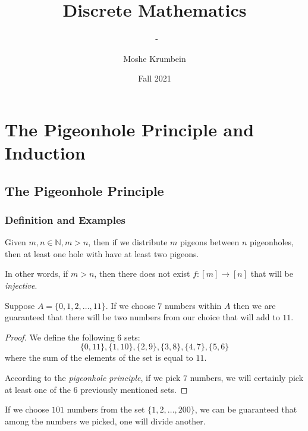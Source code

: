 \documentclass[00_complete]{subfiles}
\title{Discrete Mathematics}
\author{Moshe Krumbein}
\date{Fall 2021}
\begin{document}
\setcounter{chapter}{7}

\chapter{The Pigeonhole Principle and Induction}
\subtitle{\theauthor~- \thedate}

\section{The Pigeonhole Principle}
\subsection{Definition and Examples}
\begin{definition}
    Given $m, n \in \mathbb{N}, m>n$, then if we distribute $m$ pigeons between
    $n$ pigeonholes, then at least one hole with have at least two pigeons.

    In other words, if $m>n$, then there does not exist $f: [m] \to [n]$ that
    will be \emph{injective}.
\end{definition}

\begin{claim}
    Suppose $A =\{0,1,2,\dots,11\}$. If we choose $7$ numbers within $A$ then
    we are guaranteed that there will be two numbers from our choice that will
    add to $11$.
\end{claim}

\begin{proof}
    We define the following $6$ sets:
    $$\{0,11\},\{1,10\}, \{2,9\}, \{3,8\}, \{4,7\}, \{5,6\}$$
    where the sum of the elements of the set is equal to $11$.

    According to the \emph{pigeonhole principle}, if we pick $7$ numbers, we
    will certainly pick at least one of the $6$ previously mentioned sets.
\end{proof}

\begin{claim}
    If we choose $101$ numbers from the set $\{1,2,\dots,200\}$, we can be
    guaranteed that among the numbers we picked, one will divide
    another.
\end{claim}
\end{document}
